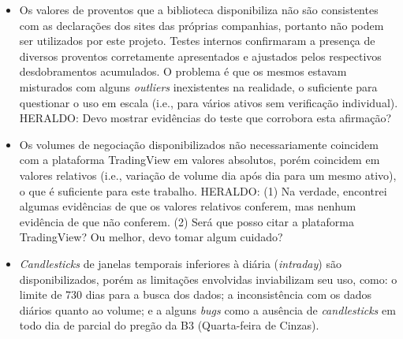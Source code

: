\begin{itemize}
    \item Os valores de proventos que a biblioteca disponibiliza não são consistentes com as declarações dos sites das próprias companhias, portanto não podem ser utilizados por este projeto. Testes internos confirmaram a presença de diversos proventos corretamente apresentados e ajustados pelos respectivos desdobramentos acumulados. O problema é que os mesmos estavam misturados com alguns \textit{outliers} inexistentes na realidade, o suficiente para questionar o uso em escala (i.e., para vários ativos sem verificação individual). \color{red} HERALDO: Devo mostrar evidências do teste que corrobora esta afirmação? 

    \item Os volumes de negociação disponibilizados não necessariamente coincidem com a plataforma TradingView em valores absolutos, porém coincidem em valores relativos (i.e., variação de volume dia após dia para um mesmo ativo), o que é suficiente para este trabalho. \color{red} HERALDO: (1) Na verdade, encontrei algumas evidências de que os valores relativos conferem, mas nenhum evidência de que não conferem. (2) Será que posso citar a plataforma TradingView? Ou melhor, devo tomar algum cuidado? 

    \item \textit{Candlesticks} de janelas temporais inferiores à diária (\textit{intraday}) são disponibilizados, porém as limitações envolvidas inviabilizam seu uso, como: o limite de 730 dias para a busca dos dados; a inconsistência com os dados diários quanto ao volume; e a alguns \textit{bugs} como a ausência de \textit{candlesticks} em todo dia de parcial do pregão da B3 (Quarta-feira de Cinzas).
\end{itemize}


